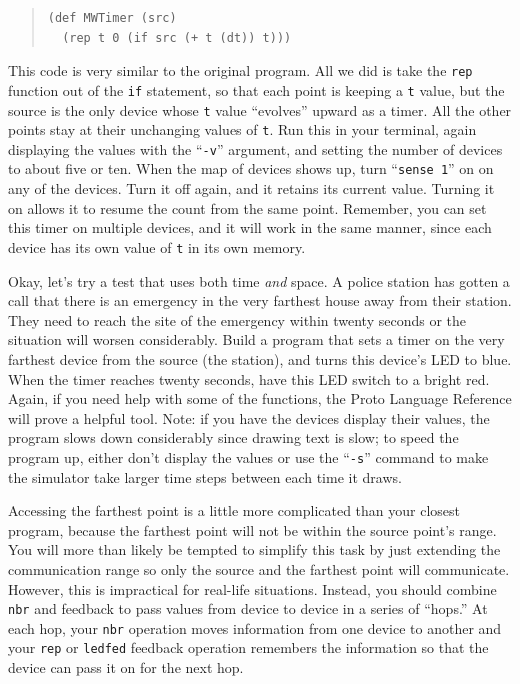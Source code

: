 \documentclass{article}
\newcommand\var[1]{{\tt #1}}
\newcommand\qvar[1]{``{\tt #1}''}
\begin{document}
\begin{quote}
\begin{verbatim}
(def MWTimer (src) 
  (rep t 0 (if src (+ t (dt)) t)))
\end{verbatim}
\end{quote}

This code is very similar to the original program. All we did is take
the \var{rep} function out of the \var{if} statement, so that each
point is keeping a \var{t} value, but the source is the only device
whose \var{t} value ``evolves'' upward as a timer.  All the other
points stay at their unchanging values of \var{t}.  Run this in your
terminal, again displaying the values with the \qvar{-v} argument, and
setting the number of devices to about five or ten.  When the map of
devices shows up, turn \qvar{sense 1} on on any of the devices.  Turn
it off again, and it retains its current value.  Turning it on allows
it to resume the count from the same point.  Remember, you can set
this timer on multiple devices, and it will work in the same manner,
since each device has its own value of \var{t} in its own memory.

Okay, let's try a test that uses both time {\em and} space.  A police
station has gotten a call that there is an emergency in the very
farthest house away from their station.  They need to reach the site
of the emergency within twenty seconds or the situation will worsen
considerably.  Build a program that sets a timer on the very farthest
device from the source (the station), and turns this device's LED to
blue.  When the timer reaches twenty seconds, have this LED switch to
a bright red.  Again, if you need help with some of the functions, the
Proto Language Reference will prove a helpful tool.  Note: if you have
the devices display their values, the program slows down considerably
since drawing text is slow; to speed the program up, either don't
display the values or use the \qvar{-s} command to make the simulator
take larger time steps between each time it draws.

Accessing the farthest point is a little more complicated than your
closest program, because the farthest point will not be within the
source point's range.  You will more than likely be tempted to
simplify this task by just extending the communication range so only
the source and the farthest point will communicate.  However, this is
impractical for real-life situations.  Instead, you should combine
\var{nbr} and feedback to pass values from device to device in a
series of ``hops.''  At each hop, your \var{nbr} operation moves
information from one device to another and your \var{rep} or
\var{ledfed} feedback operation remembers the information so that the
device can pass it on for the next hop.
\end{document}
